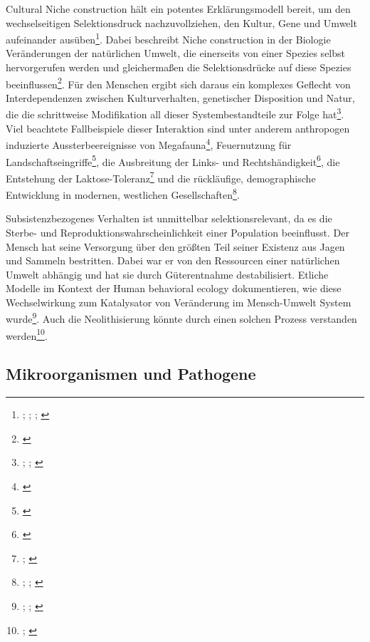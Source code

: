 \documentclass[openany,twoside,twocolumn]{book}
\let\rmarkdownfootnote\footnote%
\def\footnote{\protect\rmarkdownfootnote}
\begin{document}
Cultural Niche construction hält ein potentes Erklärungsmodell bereit,
um den wechselseitigen Selektionsdruck nachzuvollziehen, den Kultur,
Gene und Umwelt aufeinander ausüben\footnote{\textcite{laland_niche_2000};
  \textcite{odling-smee_niche_2003}; \textcite{laland_cultural_2011};
  \textcite{rendell_runaway_2011}}. Dabei beschreibt Niche construction
in der Biologie Veränderungen der natürlichen Umwelt, die einerseits von
einer Spezies selbst hervorgerufen werden und gleichermaßen die
Selektionsdrücke auf diese Spezies beeinflussen\footnote{\textcite{laland_niche_2006}}.
Für den Menschen ergibt sich daraus ein komplexes Geflecht von
Interdependenzen zwischen Kulturverhalten, genetischer Disposition und
Natur, die die schrittweise Modifikation all dieser Systembestandteile
zur Folge hat\footnote{\textcite{alberti_global_2017};
  \textcite{creanza_models_2012}; \textcite{laland_cultural_2001}}. Viel
beachtete Fallbeispiele dieser Interaktion sind unter anderem
anthropogen induzierte Aussterbeereignisse von Megafauna\footnote{\textcite{barnosky_assessing_2004}},
Feuernutzung für Landschaftseingriffe\footnote{\textcite{bird_fire_2008}},
die Ausbreitung der Links- und Rechtshändigkeit\footnote{\textcite{laland_gene-culture_1995}},
die Entstehung der Laktose-Toleranz\footnote{\textcite{feldman_theory_1989};
  \textcite{ingram_population_2012}} und die rückläufige, demographische
Entwicklung in modernen, westlichen Gesellschaften\footnote{\textcite{borgerhoff_mulder_demographic_1998};
  \textcite{fogarty_role_2013}; \textcite{ihara_cultural_2004}}.

Subsistenzbezogenes Verhalten ist unmittelbar selektionsrelevant, da es
die Sterbe- und Reproduktionswahrscheinlichkeit einer Population
beeinflusst. Der Mensch hat seine Versorgung über den größten Teil
seiner Existenz aus Jagen und Sammeln bestritten. Dabei war er von den
Ressourcen einer natürlichen Umwelt abhängig und hat sie durch
Güterentnahme destabilisiert. Etliche Modelle im Kontext der Human
behavioral ecology dokumentieren, wie diese Wechselwirkung zum
Katalysator von Veränderung im Mensch-Umwelt System wurde\footnote{\textcite{hardy_climatic_2010};
  \textcite{hockett_nutritional_2005}; \textcite{stiner_thirty_2001}}.
Auch die Neolithisierung könnte durch einen solchen Prozess verstanden
werden\footnote{\textcite{rowley-conwy_foraging_2011};
  \textcite{smith_onset_2013}}.

\hypertarget{mikroorganismen-und-pathogene}{%
\subsection{Mikroorganismen und
Pathogene}\label{mikroorganismen-und-pathogene}}
\end{document}
